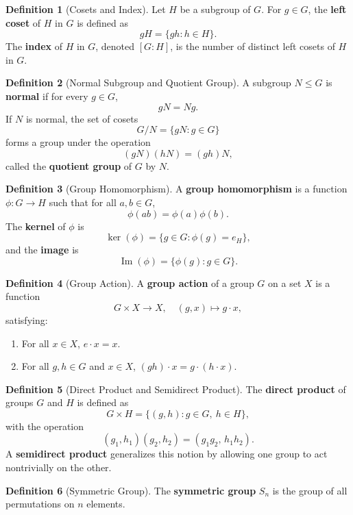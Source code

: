 \documentclass[12pt]{article}
\theoremstyle{definition} %
\newtheorem{definition}{Definition}
\theoremstyle{plain} %
\begin{document}
\begin{definition}[Cosets and Index]
Let \(H\) be a subgroup of \(G\). For \(g\in G\), the \textbf{left coset} of \(H\) in \(G\) is defined as
\[
gH = \{gh : h\in H\}.
\]
The \textbf{index} of \(H\) in \(G\), denoted \([G : H]\), is the number of distinct left cosets of \(H\) in \(G\).
\end{definition}

\begin{definition}[Normal Subgroup and Quotient Group]
A subgroup \(N\le G\) is \textbf{normal} if for every \(g\in G\), 
\[
gN = Ng.
\]
If \(N\) is normal, the set of cosets 
\[
G/N = \{gN : g\in G\}
\]
forms a group under the operation 
\[
(gN)(hN) = (gh)N,
\]
called the \textbf{quotient group} of \(G\) by \(N\).
\end{definition}

\begin{definition}[Group Homomorphism]
A \textbf{group homomorphism} is a function \(\phi: G \to H\) such that for all \(a,b\in G\),
\[
\phi(ab) = \phi(a)\phi(b).
\]
The \textbf{kernel} of \(\phi\) is
\[
\ker(\phi) = \{g\in G : \phi(g) = e_H\},
\]
and the \textbf{image} is
\[
\operatorname{Im}(\phi) = \{\phi(g) : g\in G\}.
\]
\end{definition}

\begin{definition}[Group Action]
A \textbf{group action} of a group \(G\) on a set \(X\) is a function 
\[
G\times X \to X,\quad (g,x) \mapsto g\cdot x,
\]
satisfying:
\begin{enumerate}[label=(\roman*)]
    \item For all \(x\in X\), \(e\cdot x = x\).
    \item For all \(g,h\in G\) and \(x\in X\), \((gh)\cdot x = g\cdot (h\cdot x)\).
\end{enumerate}
\end{definition}

\begin{definition}[Direct Product and Semidirect Product]
The \textbf{direct product} of groups \(G\) and \(H\) is defined as
\[
G \times H = \{(g,h) : g\in G,\ h\in H\},
\]
with the operation 
\[
(g_1,h_1)(g_2,h_2) = (g_1g_2,\, h_1h_2).
\]
A \textbf{semidirect product} generalizes this notion by allowing one group to act nontrivially on the other.
\end{definition}

\begin{definition}[Symmetric Group]
The \textbf{symmetric group} \(S_n\) is the group of all permutations on \(n\) elements.
\end{definition}
\end{document}
